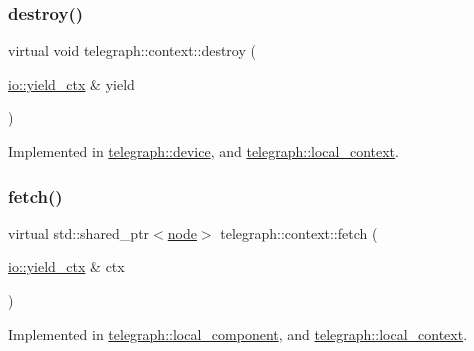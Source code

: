 \subsubsection{\texorpdfstring{destroy()}{destroy()}}
{\footnotesize\ttfamily virtual void telegraph\+::context\+::destroy (\begin{DoxyParamCaption}\item[{\hyperlink{structboost_1_1asio_1_1yield__ctx}{io\+::yield\+\_\+ctx} \&}]{yield }\end{DoxyParamCaption})\hspace{0.3cm}{\ttfamily [pure virtual]}}



Implemented in \hyperlink{classtelegraph_1_1device_a8d619b64e89b2ae933b282dc05956d37}{telegraph\+::device}, and \hyperlink{classtelegraph_1_1local__context_a301da16810636030a5098e4838587a99}{telegraph\+::local\+\_\+context}.

\mbox{\label{classtelegraph_1_1context_aa2c0321629f2d51c8bc5632e418b305f}} 
\subsubsection{\texorpdfstring{fetch()}{fetch()}}
{\footnotesize\ttfamily virtual std\+::shared\+\_\+ptr$<$\hyperlink{classtelegraph_1_1node}{node}$>$ telegraph\+::context\+::fetch (\begin{DoxyParamCaption}\item[{\hyperlink{structboost_1_1asio_1_1yield__ctx}{io\+::yield\+\_\+ctx} \&}]{ctx }\end{DoxyParamCaption})\hspace{0.3cm}{\ttfamily [pure virtual]}}



Implemented in \hyperlink{classtelegraph_1_1local__component_abbeb3b12dc95e19e1a2972e9a374fd33}{telegraph\+::local\+\_\+component}, and \hyperlink{classtelegraph_1_1local__context_aefadafdf25e6f6ba23c4b332872836e2}{telegraph\+::local\+\_\+context}.

\mbox{\label{classtelegraph_1_1context_a5df9df51fb9fc54d69e4a7d43e66345a}} 
